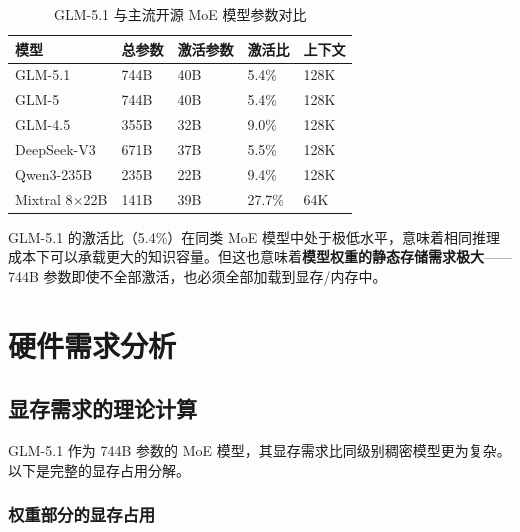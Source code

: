 \documentclass[UTF8,a4paper,10pt,oneside]{ctexart}
\begin{document}
\begin{table}[htbp]
\centering
\caption{GLM-5.1 与主流开源 MoE 模型参数对比}
\begin{tabular}{p{2.5cm}p{1.8cm}p{1.8cm}p{2cm}p{2.5cm}}
\hline
\textbf{模型} & \textbf{总参数} & \textbf{激活参数} & \textbf{激活比} & \textbf{上下文} \\
\hline
GLM-5.1 & 744B & 40B & 5.4\% & 128K \\
GLM-5 & 744B & 40B & 5.4\% & 128K \\
GLM-4.5 & 355B & 32B & 9.0\% & 128K \\
DeepSeek-V3 & 671B & 37B & 5.5\% & 128K \\
Qwen3-235B & 235B & 22B & 9.4\% & 128K \\
Mixtral 8$\times$22B & 141B & 39B & 27.7\% & 64K \\
\hline
\end{tabular}
\end{table}

GLM-5.1 的激活比（5.4\%）在同类 MoE 模型中处于极低水平，意味着相同推理成本下可以承载更大的知识容量。但这也意味着\textbf{模型权重的静态存储需求极大}——744B 参数即使不全部激活，也必须全部加载到显存/内存中。


\section{硬件需求分析}

\subsection{显存需求的理论计算}

GLM-5.1 作为 744B 参数的 MoE 模型，其显存需求比同级别稠密模型更为复杂。以下是完整的显存占用分解。

\subsubsection{权重部分的显存占用}
\end{document}
